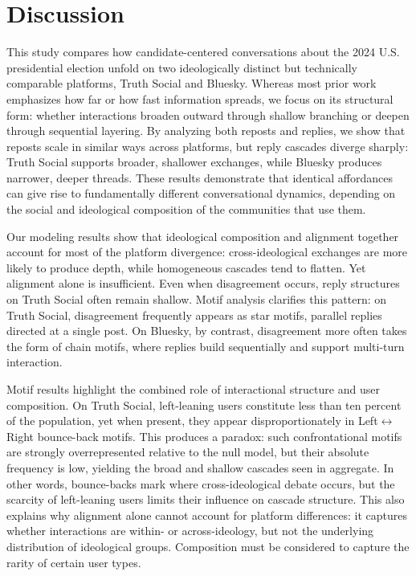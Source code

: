 \documentclass[letterpaper]{article} %
\begin{document}
\section{Discussion}
This study compares how candidate-centered conversations about the 2024 U.S. presidential election unfold on two ideologically distinct but technically comparable platforms, Truth Social and Bluesky. Whereas most prior work emphasizes how far or how fast information spreads, we focus on its structural form: whether interactions broaden outward through shallow branching or deepen through sequential layering. By analyzing both reposts and replies, we show that reposts scale in similar ways across platforms, but reply cascades diverge sharply: Truth Social supports broader, shallower exchanges, while Bluesky produces narrower, deeper threads. These results demonstrate that identical affordances can give rise to fundamentally different conversational dynamics, depending on the social and ideological composition of the communities that use them.

Our modeling results show that ideological composition and alignment together account for most of the platform divergence: cross-ideological exchanges are more likely to produce depth, while homogeneous cascades tend to flatten. Yet alignment alone is insufficient. Even when disagreement occurs, reply structures on Truth Social often remain shallow. Motif analysis clarifies this pattern: on Truth Social, disagreement frequently appears as star motifs, parallel replies directed at a single post. On Bluesky, by contrast, disagreement more often takes the form of chain motifs, where replies build sequentially and support multi-turn interaction.

Motif results highlight the combined role of interactional structure and user composition. On Truth Social, left-leaning users constitute less than ten percent of the population, yet when present, they appear disproportionately in Left$\leftrightarrow$Right bounce-back motifs. This produces a paradox: such confrontational motifs are strongly overrepresented relative to the null model, but their absolute frequency is low, yielding the broad and shallow cascades seen in aggregate. In other words, bounce-backs mark where cross-ideological debate occurs, but the scarcity of left-leaning users limits their influence on cascade structure. This also explains why alignment alone cannot account for platform differences: it captures whether interactions are within- or across-ideology, but not the underlying distribution of ideological groups. Composition must be considered to capture the rarity of certain user types.
\end{document}
